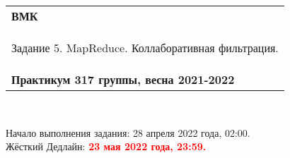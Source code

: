 \documentclass[10pt,fleqn]{article}
\begin{document}
\begin{center}
    \begin{tabular}{|p{17.5cm}|}
        \hline
        \textbf{ВМК}\\
        \begin{center} \Large Задание 5. MapReduce. Коллаборативная фильтрация. \end{center}\\
        \textbf{Практикум 317 группы, весна 2021-2022}\\
        \hline
    \end{tabular}
\end{center}

\

\begin{tabbing}
    Начало выполнения задания: 28 апреля 2022 года, 02:00.\\
    Жёсткий Дедлайн: \textcolor{red}{\bf 23 мая 2022 года, 23:59.}
\end{tabbing}

\end{document}
